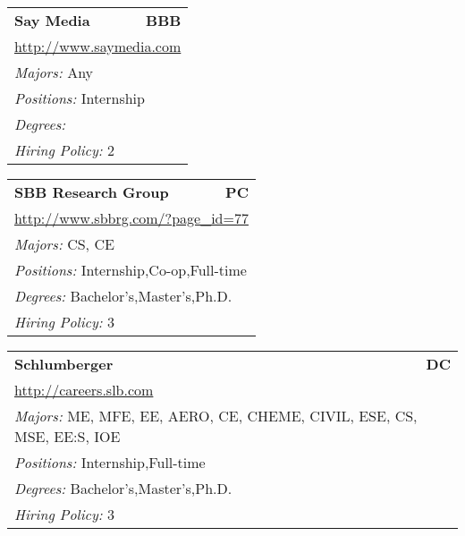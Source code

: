 \documentclass[twoside]{article}
\begin{document}
\begin{center}
\begin{multicols}{3}
\begin{FlushLeft}
\begin{minipage}{\columnwidth}
\end{minipage}
 
\begin{minipage}{\columnwidth}\begin{tabularx}{.95\columnwidth}{Xr}
                 {\Large\bf Say Media} & {\Large\bf BBB}\\
    \multicolumn{2}{p{.95\columnwidth}}{\url{http://www.saymedia.com}}\\
    \multicolumn{2}{p{.95\columnwidth}}{\emph{Majors:} Any}\\
    \multicolumn{2}{p{.95\columnwidth}}{\emph{Positions:} Internship}\\
    \multicolumn{2}{p{.95\columnwidth}}{\emph{Degrees:} }\\
    \multicolumn{2}{p{.95\columnwidth}}{\emph{Hiring Policy:} 2}\\
    \end{tabularx}
    
\end{minipage}
 
\begin{minipage}{\columnwidth}\begin{tabularx}{.95\columnwidth}{Xr}
                 {\Large\bf SBB Research Group} & {\Large\bf PC}\\
    \multicolumn{2}{p{.95\columnwidth}}{\url{http://www.sbbrg.com/?page_id=77}}\\
    \multicolumn{2}{p{.95\columnwidth}}{\emph{Majors:} CS, CE}\\
    \multicolumn{2}{p{.95\columnwidth}}{\emph{Positions:} Internship,Co-op,Full-time}\\
    \multicolumn{2}{p{.95\columnwidth}}{\emph{Degrees:} Bachelor's,Master's,Ph.D.}\\
    \multicolumn{2}{p{.95\columnwidth}}{\emph{Hiring Policy:} 3}\\
    \end{tabularx}
    
\end{minipage}
 
\begin{minipage}{\columnwidth}\begin{tabularx}{.95\columnwidth}{Xr}
                 {\Large\bf Schlumberger} & {\Large\bf DC}\\
    \multicolumn{2}{p{.95\columnwidth}}{\url{http://careers.slb.com}}\\
    \multicolumn{2}{p{.95\columnwidth}}{\emph{Majors:} ME, MFE, EE, AERO, CE, CHEME, CIVIL, ESE, CS, MSE, EE:S, IOE}\\
    \multicolumn{2}{p{.95\columnwidth}}{\emph{Positions:} Internship,Full-time}\\
    \multicolumn{2}{p{.95\columnwidth}}{\emph{Degrees:} Bachelor's,Master's,Ph.D.}\\
    \multicolumn{2}{p{.95\columnwidth}}{\emph{Hiring Policy:} 3}\\
    \end{tabularx}
    

\end{minipage}
\end{FlushLeft}
\end{multicols}
\end{center}
\end{document}
